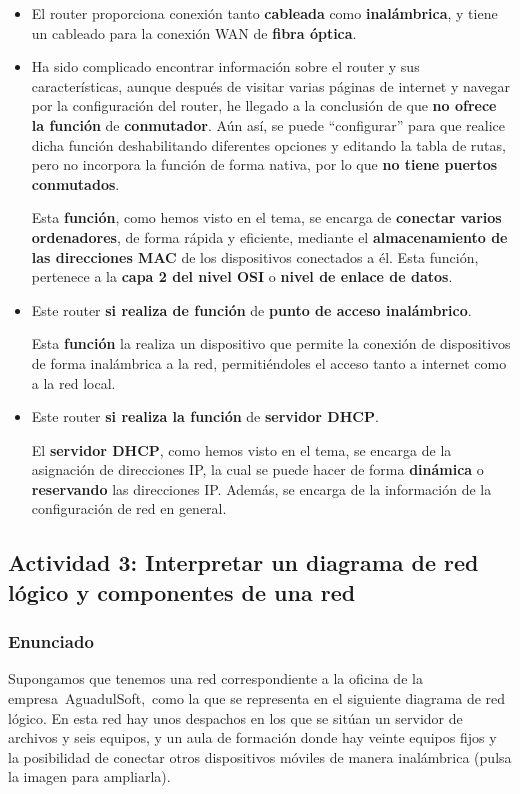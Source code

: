 \begin{itemize}
    \item El router proporciona conexión tanto \textbf{cableada} como \textbf{inalámbrica}, y tiene un cableado para la conexión WAN de \textbf{fibra óptica}.
    \item Ha sido complicado encontrar información sobre el router y sus características, aunque después de visitar varias páginas de internet y navegar por la configuración del router, he llegado a la conclusión de que \textbf{no ofrece la función} de \textbf{conmutador}. Aún así, se puede ``configurar'' para que realice dicha función deshabilitando diferentes opciones y editando la tabla de rutas, pero no incorpora la función de forma nativa, por lo que \textbf{no tiene puertos conmutados}.

    Esta \textbf{función}, como hemos visto en el tema, se encarga de \textbf{conectar varios ordenadores}, de forma rápida y eficiente, mediante el \textbf{almacenamiento de las direcciones MAC} de los dispositivos conectados a él. Esta función, pertenece a la\textbf{ capa 2 del nivel OSI} o \textbf{nivel de enlace de datos}.

    \item Este router \textbf{si realiza de función} de \textbf{punto de acceso inalámbrico}.

    Esta \textbf{función} la realiza un dispositivo que permite la conexión de dispositivos de forma inalámbrica a la red, permitiéndoles el acceso tanto a internet como a la red local.

    \item Este router \textbf{si realiza la función} de \textbf{servidor DHCP}.

    El \textbf{servidor DHCP}, como hemos visto en el tema, se encarga de la asignación de direcciones IP, la cual se puede hacer de forma \textbf{dinámica} o \textbf{reservando} las direcciones IP. Además, se encarga de la información de la configuración de red en general.
\end{itemize}


\subsection{Actividad 3: Interpretar un diagrama de red lógico y componentes de una red}

\subsubsection{Enunciado}
Supongamos que tenemos una red correspondiente a la oficina de la empresa AguadulSoft, como la que se representa en el siguiente diagrama de red lógico. En esta red hay unos despachos en los que se sitúan un servidor de archivos y seis equipos, y un aula de formación donde hay veinte equipos fijos y la posibilidad de conectar otros dispositivos móviles de manera inalámbrica (pulsa la imagen para ampliarla).

